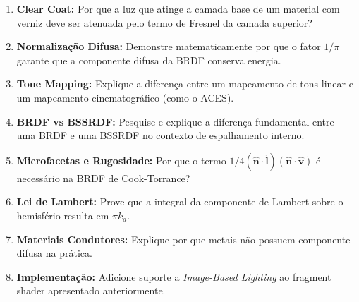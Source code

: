 \begin{enumerate}
    \item \textbf{Clear Coat:} Por que a luz que atinge a camada base de um material com verniz deve ser atenuada pelo termo de Fresnel da camada superior?
    \item \textbf{Normalização Difusa:} Demonstre matematicamente por que o fator $1/\pi$ garante que a componente difusa da BRDF conserva energia.
    \item \textbf{Tone Mapping:} Explique a diferença entre um mapeamento de tons linear e um mapeamento cinematográfico (como o ACES).
    \item \textbf{BRDF vs BSSRDF:} Pesquise e explique a diferença fundamental entre uma BRDF e uma BSSRDF no contexto de espalhamento interno.
    \item \textbf{Microfacetas e Rugosidade:} Por que o termo $1/4(\hat{\mathbf{n}}\cdot\hat{\mathbf{l}})(\hat{\mathbf{n}}\cdot\hat{\mathbf{v}})$ é necessário na BRDF de Cook-Torrance?
    \item \textbf{Lei de Lambert:} Prove que a integral da componente de Lambert sobre o hemisfério resulta em $\pi k_d$.
    \item \textbf{Materiais Condutores:} Explique por que metais não possuem componente difusa na prática.
    \item \textbf{Implementação:} Adicione suporte a \textit{Image-Based Lighting} ao fragment shader apresentado anteriormente.
\end{enumerate}

